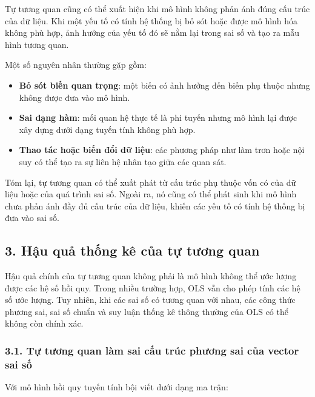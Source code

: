 Tự tương quan cũng có thể xuất hiện khi mô hình không phản ánh đúng cấu trúc của dữ liệu. Khi một yếu tố có tính hệ thống bị bỏ sót hoặc được mô hình hóa không phù hợp, ảnh hưởng của yếu tố đó sẽ nằm lại trong sai số và tạo ra mẫu hình tương quan.

Một số nguyên nhân thường gặp gồm:

\begin{itemize}
    \item \textbf{Bỏ sót biến quan trọng}: một biến có ảnh hưởng đến biến phụ thuộc nhưng không được đưa vào mô hình.
    
    \item \textbf{Sai dạng hàm}: mối quan hệ thực tế là phi tuyến nhưng mô hình lại được xây dựng dưới dạng tuyến tính không phù hợp.
    
    \item \textbf{Thao tác hoặc biến đổi dữ liệu}: các phương pháp như làm trơn hoặc nội suy có thể tạo ra sự liên hệ nhân tạo giữa các quan sát.
\end{itemize}

Tóm lại, tự tương quan có thể xuất phát từ cấu trúc phụ thuộc vốn có của dữ liệu hoặc của quá trình sai số. Ngoài ra, nó cũng có thể phát sinh khi mô hình chưa phản ánh đầy đủ cấu trúc của dữ liệu, khiến các yếu tố có tính hệ thống bị đưa vào sai số.


\subsection{3. Hậu quả thống kê của tự tương
quan}\label{hux1eadu-quux1ea3-thux1ed1ng-kuxea-cux1ee7a-tux1ef1-tux1b0ux1a1ng-quan}

Hậu quả chính của tự tương quan không phải là mô hình không thể ước lượng được các hệ số hồi quy. Trong nhiều trường hợp, OLS vẫn cho phép tính các hệ số ước lượng. Tuy nhiên, khi các sai số có tương quan với nhau, các công thức phương sai, sai số chuẩn và suy luận thống kê thông thường của OLS có thể không còn chính xác.

\subsubsection{3.1. Tự tương quan làm sai cấu trúc phương sai của vector
sai
số}\label{tux1ef1-tux1b0ux1a1ng-quan-luxe0m-sai-cux1ea5u-truxfac-phux1b0ux1a1ng-sai-cux1ee7a-vector-sai-sux1ed1}

Với mô hình hồi quy tuyến tính bội viết dưới dạng ma trận:

